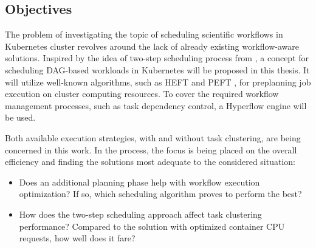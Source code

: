 \subsection{Objectives}
\label{s:Introduction:Problem}




The problem of investigating the topic of scheduling scientific workflows in Kubernetes cluster revolves around the lack of already existing workflow-aware solutions.
Inspired by the idea of two-step scheduling process from \cite{b:Graphene}, a concept for scheduling DAG-based workloads in Kubernetes will be proposed in this thesis.
It will utilize well-known algorithms, such as HEFT \cite{b:HEFT} and PEFT \cite{b:PEFT}, for preplanning job execution on cluster computing resources.
To cover the required workflow management processes, such as task dependency control, a Hyperflow engine \cite{b:Hyperflow} will be used.

Both available execution strategies, with and without task clustering, are being concerned in this work.
In the process, the focus is being placed on the overall efficiency and finding the solutions most adequate to the considered situation:





\begin{itemize}
  \item Does an additional planning phase help with workflow execution optimization? If so, which scheduling algorithm proves to perform the best?
  
  \item How does the two-step scheduling approach affect task clustering performance? Compared to the solution with optimized container CPU requests, how well does it fare?
\end{itemize}



